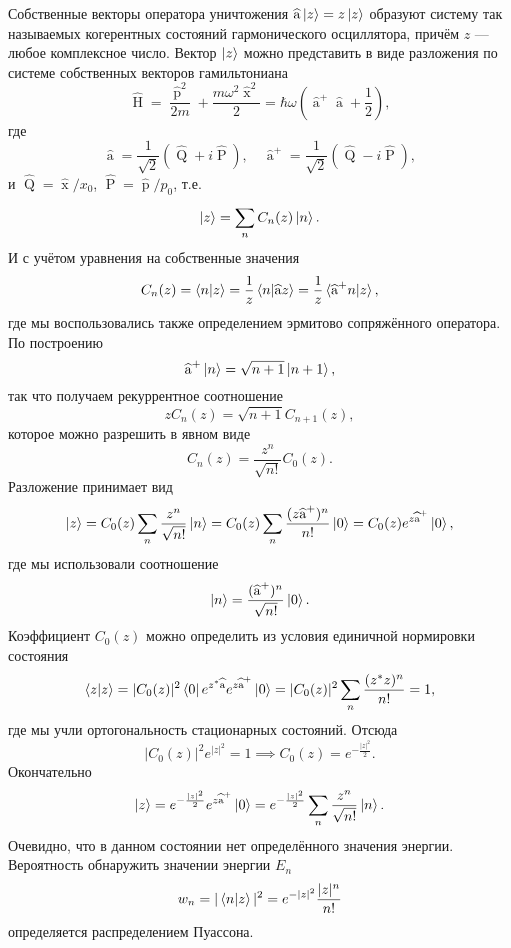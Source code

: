 \documentclass[a4paper]{article}
\begin{document}
\begin{sol}
Собственные векторы оператора уничтожения $\widehat{\operatorname{a}}\ket{z}=z\ket{z}$ образуют систему так называемых
когерентных состояний гармонического осциллятора, причём $z$ 
--- любое комплексное число. Вектор $\ket{z}$ можно представить
в виде разложения по системе собственных векторов гамильтониана
\[
\widehat{\operatorname{H}}= \frac{\widehat{\operatorname{p}}^2}{
2m} +\frac{m \omega^2 \widehat{\operatorname{x}}^2}{2}=
\hbar \omega\left( \widehat{\operatorname{a}}^+ \widehat{\operatorname{a}}+\frac{1}{2} \right) 
,\] 
где
 \[
	 \widehat{\operatorname{a}}= \frac{1}{\sqrt{2} } \left( 
	 \widehat{\operatorname{Q}}+i \widehat{\operatorname{P}}\right) ,\quad \widehat{\operatorname{a}}^+ =\frac{1}{\sqrt{2} }
	 \left( \widehat{\operatorname{Q}}-i \widehat{\operatorname{P}} \right) 
,\]
и $\widehat{\operatorname{Q}}=\widehat{\operatorname{x}} /x_0$,
$\widehat{\operatorname{P}}=\widehat{\operatorname{p}} /p_0$, т.\:е.
\[
	\ket{z}=\sum_{n}^{} C_n(z)\ket{n}
.\] 
И с учётом уравнения на собственные значения
\[
	C_n(z)= \braket{n|z}=\frac{1}{z}\braket{n|\widehat{\operatorname{a}}z}=\frac{1}{z}\braket{\widehat{\operatorname{a}}^+n|z}
,\] 
где мы воспользовались также определением эрмитово сопряжённого
оператора. По построению
\[
\widehat{\operatorname{a}}^+\ket{n}= \sqrt{n+1} \ket{n+1}
 ,\] 
так что получаем рекуррентное соотношение
\[
	z C_n(z)=\sqrt{n+1} C_{n+1}(z)
 ,\]
которое можно разрешить в явном виде
\[
	C_n(z)= \frac{z^n}{\sqrt{n!} }C_0(z)
.\] 
Разложение принимает вид
\[
	\ket{z}= C_0 (z) \sum_{n}^{} \frac{z^n}{\sqrt{n!} }\ket{n}=C_0(z) \sum_{n}^{} \frac{(z \widehat{\operatorname{a}}^+)^n}{n!}
	\ket{0}=C_0 (z) e^{z \widehat{\operatorname{a}}^+}\ket{0}
 ,\]
где мы использовали соотношение 
\[
	\ket{n}= \frac{(\widehat{\operatorname{a}}^+)^n}{
	\sqrt{n!} }\ket{0}
.\] 
Коэффициент $C_0(z)$ можно определить из условия единичной
нормировки состояния
\[
	\braket{z|z}=|C_0(z)|^2 \bra{0}e^{z^* \widehat{\operatorname{a}}}e^{z \widehat{\operatorname{a}}^+}\ket{0}=
		|C_0(z)|^2 \sum_{n}^{} \frac{(z^* z)^n}{n!}=1
 ,\]
где мы учли ортогональность стационарных состояний. Отсюда
\[
	|C_0(z)|^2 e^{|z|^2}=1\implies C_0(z)= e^{
	- \frac{|z|^2}{2}}
.\] 
Окончательно
\[
\ket{z}= e^{- \frac{|z|^2}{2}}e^{z \widehat{\operatorname{a}}^+}
\ket{0}= e^{-\frac{|z|^2}{2}}\sum_{n}^{} \frac{z^n}{\sqrt{n!} }
\ket{n}
.\] 
Очевидно, что в данном состоянии нет определённого значения
энергии. Вероятность обнаружить значении энергии $E_n$ 
\[
w_n=|\braket{n|z}|^2= e^{-|z|^2}\frac{|z|^n}{n!}
\]
определяется распределением Пуассона.
\end{sol}
\end{document}
